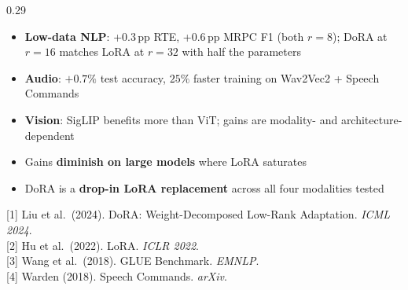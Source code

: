 \documentclass[final]{beamer}
\newcommand{\hl}[1]{\textcolor{CornellRed}{\textbf{#1}}}
\begin{document}
\begin{frame}[t]
\begin{columns}[T,totalwidth=\textwidth]
\begin{column}{0.29\textwidth}
\begin{tcolorbox}[posterblock,title=Conclusions \& References]
  \begin{itemize}\setlength\itemsep{1pt}
    \item \hl{Low-data NLP}: +0.3\,pp RTE, +0.6\,pp MRPC F1
          (both $r=8$); DoRA at $r=16$ matches LoRA at $r=32$
          with half the parameters
    \item \hl{Audio}: $+0.7\%$ test accuracy, $25\%$ faster
          training on Wav2Vec2 + Speech Commands
    \item \hl{Vision}: SigLIP benefits more than ViT; gains are
          modality- and architecture-dependent
    \item Gains \hl{diminish on large models} where LoRA saturates
    \item DoRA is a \hl{drop-in LoRA replacement} across all four
          modalities tested
  \end{itemize}

  \vspace{0.12cm}
  {\small
  [1] Liu et al.\ (2024). DoRA: Weight-Decomposed Low-Rank Adaptation.
      \textit{ICML 2024}.\\[2pt]
  [2] Hu et al.\ (2022). LoRA.  \textit{ICLR 2022}.\\[2pt]
  [3] Wang et al.\ (2018). GLUE Benchmark. \textit{EMNLP}.\\[2pt]
  [4] Warden (2018). Speech Commands. \textit{arXiv}.}
\end{tcolorbox}

\end{column}

\end{columns}

\end{frame}
\end{document}
